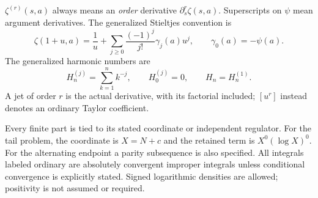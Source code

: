 \(\zeta^{(r)}(s,a)\) always means an \emph{order} derivative
\(\partial_s^r\zeta(s,a)\). Superscripts on \(\psi\) mean argument
derivatives. The generalized Stieltjes convention is
\[
 \zeta(1+u,a)=\frac1u+
   \sum_{j\ge0}\frac{(-1)^j}{j!}\gamma_j(a)u^j,
 \qquad \gamma_0(a)=-\psi(a).
\]
The generalized harmonic numbers are
\[
 H_n^{(j)}=\sum_{k=1}^{n}k^{-j},\qquad H_0^{(j)}=0,
 \qquad H_n=H_n^{(1)}.
\]
A jet of order \(r\) is the actual derivative, with its factorial included;
\([u^r]\) instead denotes an ordinary Taylor coefficient.

Every finite part is tied to its stated coordinate or independent
regulator. For the tail problem, the coordinate is \(X=N+c\) and the
retained term is \(X^0(\log X)^0\). For the alternating endpoint a parity
subsequence is also specified. All integrals labeled ordinary are
absolutely convergent improper integrals unless conditional convergence is
explicitly stated. Signed logarithmic densities are allowed; positivity
is not assumed or required.
